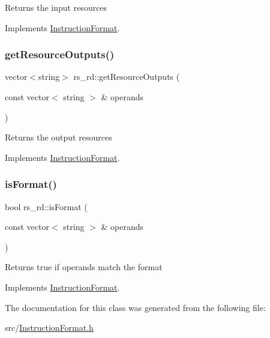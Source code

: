 Returns the input resources 

Implements \hyperlink{classInstructionFormat_a09775d3a3c22f40a0f44504664e586e4}{Instruction\+Format}.

\mbox{\label{classrs__rd_aeb39c1906a9ccd080b21dda0f711b6ed}} 
\subsubsection{\texorpdfstring{get\+Resource\+Outputs()}{getResourceOutputs()}}
{\footnotesize\ttfamily vector$<$string$>$ rs\+\_\+rd\+::get\+Resource\+Outputs (\begin{DoxyParamCaption}\item[{const vector$<$ string $>$ \&}]{operands }\end{DoxyParamCaption})\hspace{0.3cm}{\ttfamily [virtual]}}

Returns the output resources 

Implements \hyperlink{classInstructionFormat_a95cd28ffb1bde59b67f676880ab10536}{Instruction\+Format}.

\mbox{\label{classrs__rd_a982dd920345cfe325ee486e099640359}} 
\subsubsection{\texorpdfstring{is\+Format()}{isFormat()}}
{\footnotesize\ttfamily bool rs\+\_\+rd\+::is\+Format (\begin{DoxyParamCaption}\item[{const vector$<$ string $>$ \&}]{operands }\end{DoxyParamCaption})\hspace{0.3cm}{\ttfamily [virtual]}}

Returns true if operands match the format 

Implements \hyperlink{classInstructionFormat_a9fdcf94dcd7d9a55ba86e7a63f04d1fe}{Instruction\+Format}.



The documentation for this class was generated from the following file\+:\begin{DoxyCompactItemize}
\item 
src/\hyperlink{InstructionFormat_8h}{Instruction\+Format.\+h}\end{DoxyCompactItemize}
